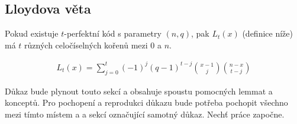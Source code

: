 \subsection{Lloydova věta}


\vt Pokud existuje $t$-perfektní kód s parametry $(n,q)$, pak $L_t(x)$ (definice níže) má $t$ různých celočíselných kořenů mezi $0$ a $n$.

\begin{align}
	L_t(x) = \sum_{j=0}^t(-1)^j(q-1)^{t-j}\binom{x-1}{j}\binom{n-x}{t-j}
\end{align}

\dk Důkaz bude plynout touto sekcí a obsahuje spoustu pomocných lemmat a konceptů. Pro pochopení a reprodukci důkazu bude potřeba pochopit všechno mezi tímto místem a a sekcí označující samotný důkaz. Nechť práce započne.


